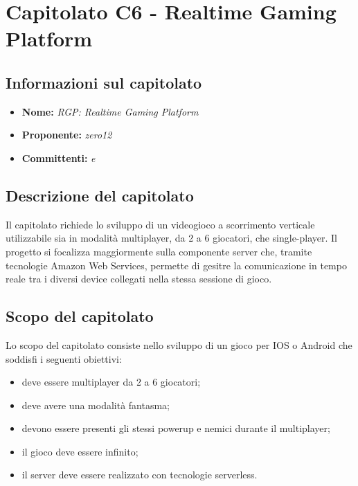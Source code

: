 \section{Capitolato C6 - Realtime Gaming Platform}
\subsection{Informazioni sul capitolato}
\begin{itemize}
	\item \textbf{Nome:} \textit{RGP: Realtime Gaming Platform}
	\item \textbf{Proponente:} \textit{zero12}
	\item \textbf{Committenti:} \textit{\VT{} e \CR{}}
\end{itemize}

\subsection{Descrizione del capitolato}
Il capitolato richiede lo sviluppo di un videogioco a scorrimento verticale utilizzabile sia in modalità multiplayer, da 2 a 6 giocatori, che single-player. Il progetto si focalizza maggiormente sulla componente server che, tramite tecnologie Amazon Web Services, permette di gesitre la comunicazione in tempo reale tra i diversi device collegati nella stessa sessione di gioco.

\subsection{Scopo del capitolato}
Lo scopo del capitolato consiste nello sviluppo di un gioco per IOS o Android che soddisfi i seguenti obiettivi:
\begin{itemize}
	\item deve essere multiplayer da 2 a 6 giocatori;
	\item deve avere una modalità fantasma;
	\item devono essere presenti gli stessi powerup e nemici durante il multiplayer;
	\item il gioco deve essere infinito;
	\item il server deve essere realizzato con tecnologie serverless.
\end{itemize}

